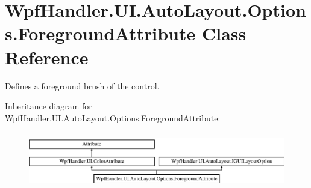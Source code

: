 \hypertarget{class_wpf_handler_1_1_u_i_1_1_auto_layout_1_1_options_1_1_foreground_attribute}{}\section{Wpf\+Handler.\+U\+I.\+Auto\+Layout.\+Options.\+Foreground\+Attribute Class Reference}
\label{class_wpf_handler_1_1_u_i_1_1_auto_layout_1_1_options_1_1_foreground_attribute}


Defines a foreground brush of the control.  


Inheritance diagram for Wpf\+Handler.\+U\+I.\+Auto\+Layout.\+Options.\+Foreground\+Attribute\+:\begin{figure}[H]
\begin{center}
\leavevmode
\includegraphics[height=2.507463cm]{dc/df7/class_wpf_handler_1_1_u_i_1_1_auto_layout_1_1_options_1_1_foreground_attribute}
\end{center}
\end{figure}
